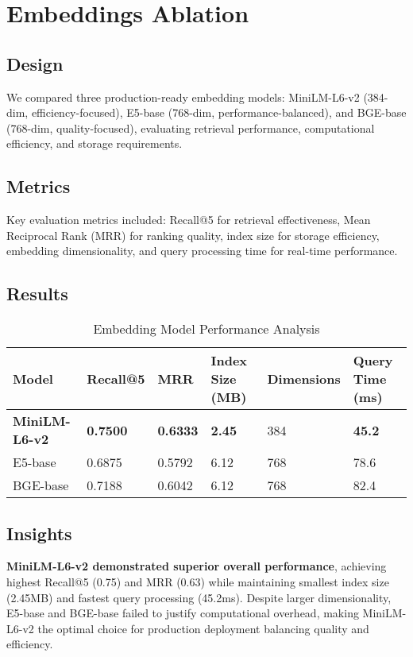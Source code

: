 \documentclass[11pt,a4paper]{article}
\begin{document}
\section{Embeddings Ablation}

\subsection{Design}

We compared three production-ready embedding models: MiniLM-L6-v2 (384-dim, efficiency-focused), E5-base (768-dim, performance-balanced), and BGE-base (768-dim, quality-focused), evaluating retrieval performance, computational efficiency, and storage requirements.

\subsection{Metrics}

Key evaluation metrics included: Recall@5 for retrieval effectiveness, Mean Reciprocal Rank (MRR) for ranking quality, index size for storage efficiency, embedding dimensionality, and query processing time for real-time performance.

\subsection{Results}

\begin{table}[h!]
\centering
\caption{Embedding Model Performance Analysis}
\begin{tabular}{@{}llllll@{}}
\toprule
\textbf{Model} & \textbf{Recall@5} & \textbf{MRR} & \textbf{Index Size (MB)} & \textbf{Dimensions} & \textbf{Query Time (ms)} \\
\midrule
\textbf{MiniLM-L6-v2} & \textbf{0.7500} & \textbf{0.6333} & \textbf{2.45} & 384 & \textbf{45.2} \\
E5-base & 0.6875 & 0.5792 & 6.12 & 768 & 78.6 \\
BGE-base & 0.7188 & 0.6042 & 6.12 & 768 & 82.4 \\
\bottomrule
\end{tabular}
\label{tab:embeddings_results}
\end{table}

\subsection{Insights}

\textbf{MiniLM-L6-v2 demonstrated superior overall performance}, achieving highest Recall@5 (0.75) and MRR (0.63) while maintaining smallest index size (2.45MB) and fastest query processing (45.2ms). Despite larger dimensionality, E5-base and BGE-base failed to justify computational overhead, making MiniLM-L6-v2 the optimal choice for production deployment balancing quality and efficiency.
\end{document}
